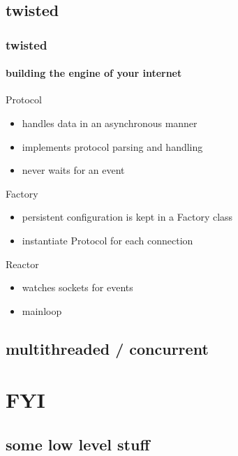 \documentclass{beamer}
\begin{document}
\subsection*{twisted}	%
\begin{frame}[fragile]
	\frametitle{twisted}
	\framesubtitle{building the engine of your internet}
	\begin{block}{Protocol}
	\begin{itemize}
		\item handles data in an asynchronous manner
		\item implements protocol parsing and handling
		\item never waits for an event
	\end{itemize}
	\end{block}

	\begin{block}{Factory}
	\begin{itemize}
		\item persistent configuration is kept in a Factory class
		\item instantiate Protocol for each connection
	\end{itemize}
	\end{block}

	\begin{block}{Reactor}
	\begin{itemize}
		\item watches sockets for events
		\item mainloop
	\end{itemize}
	\end{block}
\end{frame}

\subsection*{multithreaded / concurrent}	%


\section{FYI}

\subsection*{some low level stuff}	%
\end{document}
